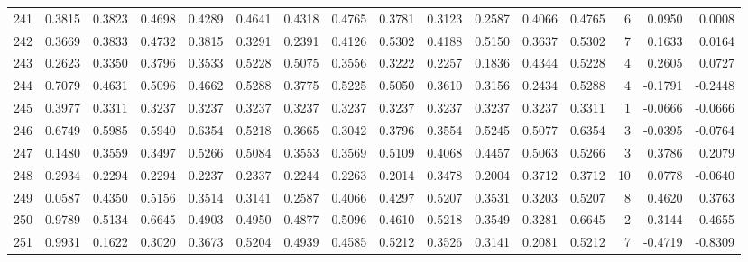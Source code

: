 \begin{tabular}{lrrrrrrrrrrrrrrr}
241 &      0.3815 &  0.3823 &  0.4698 &  0.4289 &  0.4641 &  0.4318 &  0.4765 &  0.3781 &  0.3123 &  0.2587 &   0.4066 &     0.4765 &      6 &                    0.0950 &                     0.0008 \\
242 &      0.3669 &  0.3833 &  0.4732 &  0.3815 &  0.3291 &  0.2391 &  0.4126 &  0.5302 &  0.4188 &  0.5150 &   0.3637 &     0.5302 &      7 &                    0.1633 &                     0.0164 \\
243 &      0.2623 &  0.3350 &  0.3796 &  0.3533 &  0.5228 &  0.5075 &  0.3556 &  0.3222 &  0.2257 &  0.1836 &   0.4344 &     0.5228 &      4 &                    0.2605 &                     0.0727 \\
244 &      0.7079 &  0.4631 &  0.5096 &  0.4662 &  0.5288 &  0.3775 &  0.5225 &  0.5050 &  0.3610 &  0.3156 &   0.2434 &     0.5288 &      4 &                   -0.1791 &                    -0.2448 \\
245 &      0.3977 &  0.3311 &  0.3237 &  0.3237 &  0.3237 &  0.3237 &  0.3237 &  0.3237 &  0.3237 &  0.3237 &   0.3237 &     0.3311 &      1 &                   -0.0666 &                    -0.0666 \\
246 &      0.6749 &  0.5985 &  0.5940 &  0.6354 &  0.5218 &  0.3665 &  0.3042 &  0.3796 &  0.3554 &  0.5245 &   0.5077 &     0.6354 &      3 &                   -0.0395 &                    -0.0764 \\
247 &      0.1480 &  0.3559 &  0.3497 &  0.5266 &  0.5084 &  0.3553 &  0.3569 &  0.5109 &  0.4068 &  0.4457 &   0.5063 &     0.5266 &      3 &                    0.3786 &                     0.2079 \\
248 &      0.2934 &  0.2294 &  0.2294 &  0.2237 &  0.2337 &  0.2244 &  0.2263 &  0.2014 &  0.3478 &  0.2004 &   0.3712 &     0.3712 &     10 &                    0.0778 &                    -0.0640 \\
249 &      0.0587 &  0.4350 &  0.5156 &  0.3514 &  0.3141 &  0.2587 &  0.4066 &  0.4297 &  0.5207 &  0.3531 &   0.3203 &     0.5207 &      8 &                    0.4620 &                     0.3763 \\
250 &      0.9789 &  0.5134 &  0.6645 &  0.4903 &  0.4950 &  0.4877 &  0.5096 &  0.4610 &  0.5218 &  0.3549 &   0.3281 &     0.6645 &      2 &                   -0.3144 &                    -0.4655 \\
251 &      0.9931 &  0.1622 &  0.3020 &  0.3673 &  0.5204 &  0.4939 &  0.4585 &  0.5212 &  0.3526 &  0.3141 &   0.2081 &     0.5212 &      7 &                   -0.4719 &                    -0.8309 \\

\end{tabular}
